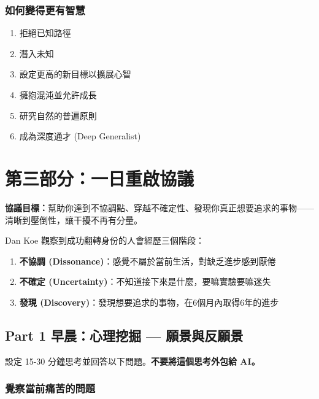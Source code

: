 \documentclass[12pt,a4paper]{article}
\begin{document}
\subsubsection{如何變得更有智慧}

\begin{enumerate}
    \item 拒絕已知路徑
    \item 潛入未知
    \item 設定更高的新目標以擴展心智
    \item 擁抱混沌並允許成長
    \item 研究自然的普遍原則
    \item 成為深度通才 (Deep Generalist)
\end{enumerate}

\section{第三部分：一日重啟協議}

\begin{importantbox}
\textbf{協議目標：}幫助你達到不協調點、穿越不確定性、發現你真正想要追求的事物——清晰到壓倒性，讓干擾不再有分量。
\end{importantbox}

Dan Koe 觀察到成功翻轉身份的人會經歷三個階段：

\begin{enumerate}
    \item \textbf{不協調 (Dissonance)}：感覺不屬於當前生活，對缺乏進步感到厭倦
    \item \textbf{不確定 (Uncertainty)}：不知道接下來是什麼，要嘛實驗要嘛迷失
    \item \textbf{發現 (Discovery)}：發現想要追求的事物，在6個月內取得6年的進步
\end{enumerate}

\subsection{Part 1 早晨：心理挖掘 — 願景與反願景}

設定 15-30 分鐘思考並回答以下問題。\textbf{不要將這個思考外包給 AI。}

\subsubsection{覺察當前痛苦的問題}
\end{document}
